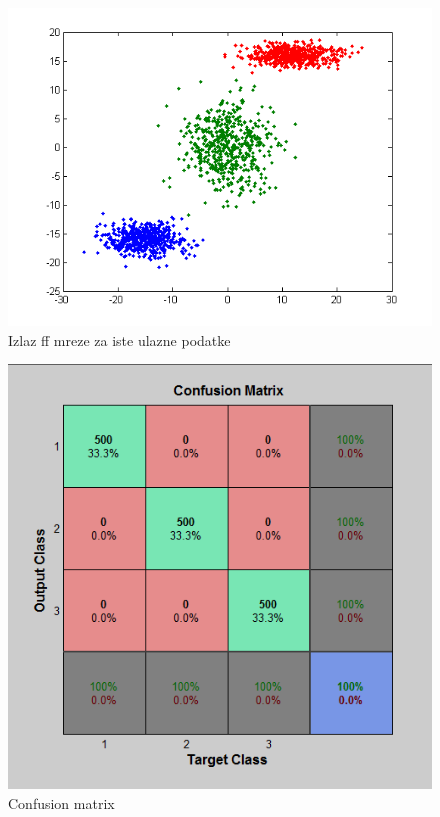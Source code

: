 \documentclass{report}
\begin{document}
\begin{enumerate}
\begin{enumerate}
\begin{figure}[!h]
\begin{center}
\includegraphics[scale=0.8]{A1outputFF1earlySame.png}
\caption{Izlaz ff mreze za iste ulazne podatke}
\end{center}
\end{figure}

\begin{figure}[!h]
\begin{center}
\includegraphics[scale=0.7]{A1confussionFF1early.png}
\caption{Confusion matrix}
\end{center}
\end{figure}


\end{enumerate}
\end{enumerate}
\end{document}
